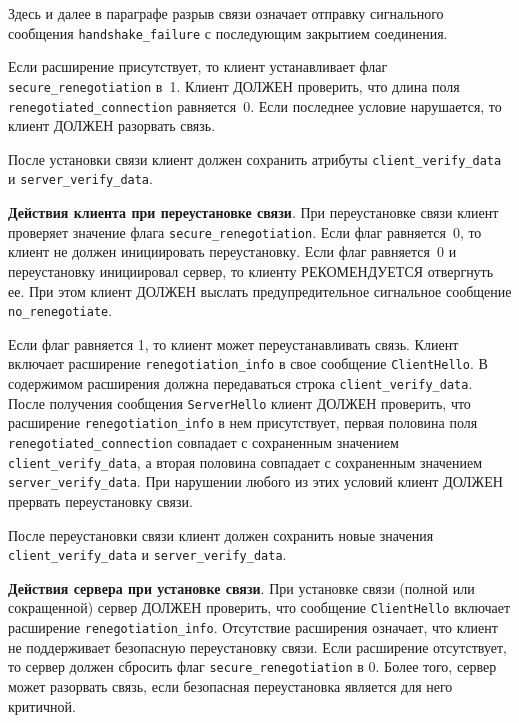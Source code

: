 \begin{note*}
Здесь и далее в параграфе разрыв связи означает отправку сигнального сообщения
\lstinline{handshake_failure} с последующим закрытием соединения.
\end{note*} 

Если расширение присутствует, то клиент устанавливает флаг 
\lstinline{secure_renegotiation} в~1. Клиент ДОЛЖЕН проверить, что длина поля 
\lstinline{renegotiated_connection} равняется~0. Если последнее условие 
нарушается, то клиент ДОЛЖЕН разорвать связь. 

После установки связи клиент должен сохранить атрибуты 
\lstinline{client_verify_data} и \lstinline{server_verify_data}. 

{\bf Действия клиента при переустановке связи}. 
При переустановке связи клиент проверяет значение флага 
\lstinline{secure_renegotiation}. Если флаг равняется~0, то клиент не должен 
инициировать переустановку. Если флаг
равняется~0 и переустановку инициировал сервер, то клиенту РЕКОМЕНДУЕТСЯ
отвергнуть ее. При этом клиент ДОЛЖЕН выслать предупредительное сигнальное
сообщение \lstinline{no_renegotiate}.

Если флаг равняется 1, то клиент может переустанавливать связь. Клиент
включает расширение \lstinline{renegotiation_info} в свое сообщение
\lstinline{ClientHello}. В содержимом расширения должна передаваться строка
\lstinline{client_verify_data}. После получения сообщения
\lstinline{ServerHello} клиент ДОЛЖЕН проверить, что расширение
\lstinline{renegotiation_info} в нем присутствует, первая половина поля
\lstinline{renegotiated_connection} совпадает с сохраненным значением
\lstinline{client_verify_data}, а вторая половина совпадает с сохраненным
значением \lstinline{server_verify_data}. При нарушении любого из этих
условий клиент ДОЛЖЕН прервать переустановку связи.

После переустановки связи клиент должен сохранить новые 
значения \lstinline{client_verify_data} и \lstinline{server_verify_data}. 

{\bf Действия сервера при установке связи}. 
При установке связи (полной или сокращенной) сервер ДОЛЖЕН проверить, что
сообщение \lstinline{ClientHello} включает расширение
\lstinline{renegotiation_info}. Отсутствие расширения означает, что клиент
не поддерживает безопасную переустановку связи. 
Если расширение отсутствует, то сервер должен сбросить флаг
\lstinline{secure_renegotiation} в 0. Более того, сервер может разорвать 
связь, если безопасная переустановка является для него критичной.

